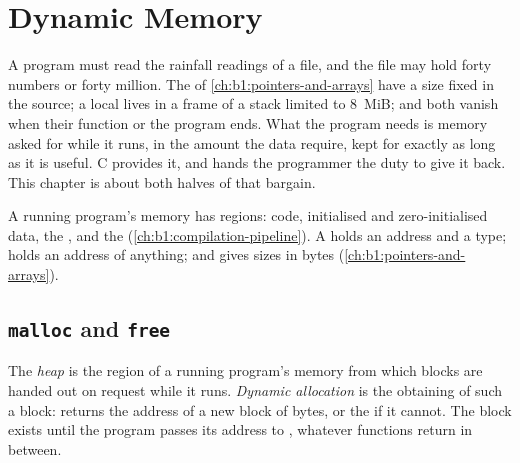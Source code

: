 \chapter{Dynamic Memory}\label{ch:b1:dynamic-memory}

A program must read the rainfall readings of a file, and the file may hold forty numbers or forty million. The 
of \cref{ch:b1:pointers-and-arrays} have a size fixed in the source; a local  lives in a frame of a stack
limited to 8~MiB; and both vanish when their function or the program ends. What the program needs is memory asked
for while it runs, in the amount the data require, kept for exactly as long as it is useful. C provides it, and
hands the programmer the duty to give it back. This chapter is about both halves of that bargain.

\begin{recall}
A running program's memory has regions: code, initialised and zero-initialised data, the , and the 
(\cref{ch:b1:compilation-pipeline}). A  holds an address and a type;  holds an address of
anything; and  gives sizes in bytes (\cref{ch:b1:pointers-and-arrays}).
\end{recall}

\section{\texttt{malloc} and \texttt{free}}\label{sec:b1:dynamic-memory:malloc}

\begin{definition}\label{def:b1:dynamic-memory:heap}
The \emph{heap} is the region of a running program's memory from which blocks are handed out on
request while it runs. \emph{Dynamic allocation} is the obtaining of such a block:
 returns the address of a new block of  bytes, or the  if it cannot. The block
exists until the program passes its address to , whatever functions return in between.
\end{definition}

